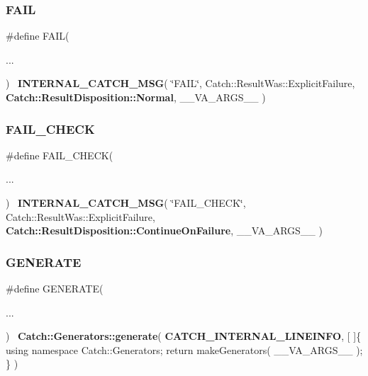 \mbox{\label{catch_8hpp_ac8d1eaf65528f86b445cf6e45b2d72c9}} 
\subsubsection{FAIL}
{\footnotesize\ttfamily \#define F\+A\+IL(\begin{DoxyParamCaption}\item[{}]{... }\end{DoxyParamCaption})~\textbf{ I\+N\+T\+E\+R\+N\+A\+L\+\_\+\+C\+A\+T\+C\+H\+\_\+\+M\+SG}( \char`\"{}F\+A\+IL\char`\"{}, Catch\+::\+Result\+Was\+::\+Explicit\+Failure, \textbf{ Catch\+::\+Result\+Disposition\+::\+Normal}, \+\_\+\+\_\+\+V\+A\+\_\+\+A\+R\+G\+S\+\_\+\+\_\+ )}

\mbox{\label{catch_8hpp_a3c2341a3238242fdc02d33a1968bd1d2}} 
\subsubsection{FAIL\_CHECK}
{\footnotesize\ttfamily \#define F\+A\+I\+L\+\_\+\+C\+H\+E\+CK(\begin{DoxyParamCaption}\item[{}]{... }\end{DoxyParamCaption})~\textbf{ I\+N\+T\+E\+R\+N\+A\+L\+\_\+\+C\+A\+T\+C\+H\+\_\+\+M\+SG}( \char`\"{}F\+A\+I\+L\+\_\+\+C\+H\+E\+CK\char`\"{}, Catch\+::\+Result\+Was\+::\+Explicit\+Failure, \textbf{ Catch\+::\+Result\+Disposition\+::\+Continue\+On\+Failure}, \+\_\+\+\_\+\+V\+A\+\_\+\+A\+R\+G\+S\+\_\+\+\_\+ )}

\mbox{\label{catch_8hpp_a4941c6427cfa36ee7c52d734e460f9df}} 
\subsubsection{GENERATE}
{\footnotesize\ttfamily \#define G\+E\+N\+E\+R\+A\+TE(\begin{DoxyParamCaption}\item[{}]{... }\end{DoxyParamCaption})~\textbf{ Catch\+::\+Generators\+::generate}( \textbf{ C\+A\+T\+C\+H\+\_\+\+I\+N\+T\+E\+R\+N\+A\+L\+\_\+\+L\+I\+N\+E\+I\+N\+FO}, [ ]\{ using namespace Catch\+::\+Generators; return make\+Generators( \+\_\+\+\_\+\+V\+A\+\_\+\+A\+R\+G\+S\+\_\+\+\_\+ ); \} )}

